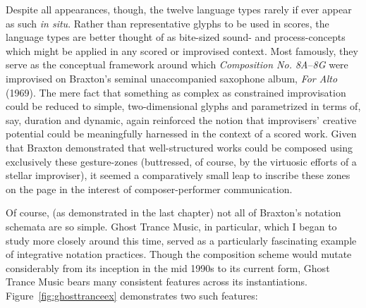     Despite all appearances, though, the twelve language types rarely if ever appear as such \textit{in situ}. Rather than representative glyphs to be used in scores, the language types are better thought of as bite-sized sound- and process-concepts which might be applied in any scored or improvised context. Most famously, they serve as the conceptual framework around which \textit{Composition No. 8A}--\textit{8G} were improvised on Braxton's seminal unaccompanied saxophone album, \textit{For Alto} (1969).\autocite[118--49]{Braxton_1988A} The mere fact that something as complex as constrained improvisation could be reduced to simple, two-dimensional glyphs and parametrized in terms of, say, duration and dynamic, again reinforced the notion that improvisers' creative potential could be meaningfully harnessed in the context of a scored work. Given that Braxton demonstrated that well-structured works could be composed using exclusively these gesture-zones (buttressed, of course, by the virtuosic efforts of a stellar improviser), it seemed a comparatively small leap to inscribe these zones on the page in the interest of composer-performer communication.

    Of course, (as demonstrated in the last chapter) not all of Braxton's notation schemata are so simple. Ghost Trance Music, in particular, which I began to study more closely around this time, served as a particularly fascinating example of integrative notation practices. Though the composition scheme would mutate considerably from its inception in the mid 1990s to its current form, Ghost Trance Music bears many consistent features across its instantiations.\autocite{Dicker_2016} Figure~\ref{fig:ghosttranceex} demonstrates two such features: 
    

